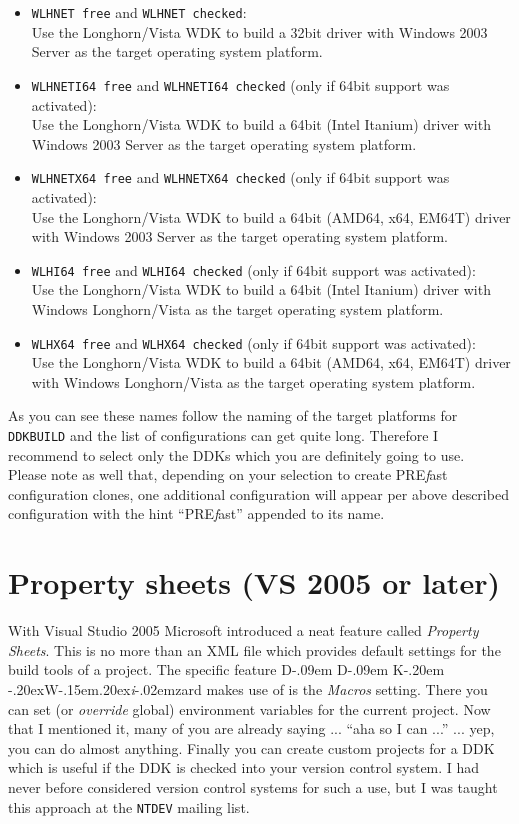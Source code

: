 \documentclass[a4paper,titlepage]{report}
\def\ddkwiz{D\kern-.09em D\kern-.09em K\kern-.20em \raise-.20ex\hbox{W}\kern-.15em\raise.20ex\hbox{\it{i}}\kern-.02em{zard}}
\newcommand{\prefast}[0]{\textsf{PRE\textsl{f}ast}}
\newcommand{\solcfg}[2]{\texttt{#1 free} and \texttt{#1 checked}:\\#2}
\newcommand{\solcfgsixfour}[2]{\texttt{#1 free} and \texttt{#1 checked} \textcolor[gray]{0.40}{\textsf{\small(only if 64bit support was activated)}}:\\#2}
\begin{document}
\begin{itemize}
  \item \solcfg{WLHNET}{Use the Longhorn/Vista WDK to build a 32bit driver with Windows 2003 Server as the target operating system platform.}
  \item \solcfgsixfour{WLHNETI64}{Use the Longhorn/Vista WDK to build a 64bit (Intel Itanium) driver with Windows 2003 Server as the target operating system platform.}
  \item \solcfgsixfour{WLHNETX64}{Use the Longhorn/Vista WDK to build a 64bit (AMD64, x64, EM64T) driver with Windows 2003 Server as the target operating system platform.}
  \item \solcfgsixfour{WLHI64}{Use the Longhorn/Vista WDK to build a 64bit (Intel Itanium) driver with Windows Longhorn/Vista as the target operating system platform.}
  \item \solcfgsixfour{WLHX64}{Use the Longhorn/Vista WDK to build a 64bit (AMD64, x64, EM64T) driver with Windows Longhorn/Vista as the target operating system platform.}
\end{itemize}

As you can see these names follow the naming of the target platforms for \texttt{DDKBUILD}
and the list of configurations can get quite long. Therefore I recommend to select only
the DDKs which you are definitely going to use.\\

Please note as well that, depending on your selection to create \prefast{} configuration
clones, one additional configuration will appear per above described configuration
with the hint ``\prefast{}'' appended to its name.

\section{Property sheets (VS 2005 or later)}
\label{sec:propsheets}
With Visual Studio 2005 Microsoft introduced a neat feature called \emph{Property Sheets}.
This is no more than an XML file which provides default settings for the build tools
of a project. The specific feature \ddkwiz{} makes use of is the \emph{Macros}
setting. There you can set (or \emph{override} global) environment variables for the
current project. Now that I mentioned it, many of you are already saying ... ``aha
so I can ...'' ... yep, you can do almost anything. Finally you can create custom
projects for a DDK which is useful if the DDK is checked into your version control
system. I had never before considered version control systems for such a use, but
I was taught this approach at the \texttt{NTDEV} mailing list.
\end{document}
